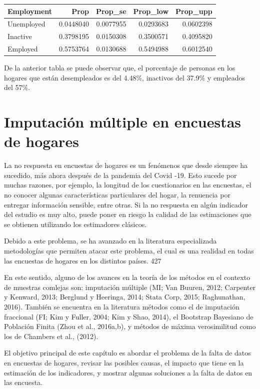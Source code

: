 \documentclass[
  12pt,
]{book}
\begin{document}
\begin{tabular}{l|r|r|r|r}
\hline
Employment & Prop & Prop\_se & Prop\_low & Prop\_upp\\
\hline
Unemployed & 0.0448040 & 0.0077955 & 0.0293683 & 0.0602398\\
\hline
Inactive & 0.3798195 & 0.0150308 & 0.3500571 & 0.4095820\\
\hline
Employed & 0.5753764 & 0.0130688 & 0.5494988 & 0.6012540\\
\hline
\end{tabular}

De la anterior tabla se puede observar que, el porcentaje de personas en los hogares que están desempleados es del 4.48\%, inactivos del 37.9\% y empleados del 57\%.

\hypertarget{imputaciuxf3n-muxfaltiple-en-encuestas-de-hogares}{%
\chapter{Imputación múltiple en encuestas de hogares}\label{imputaciuxf3n-muxfaltiple-en-encuestas-de-hogares}}

La no respuesta en encuestas de hogares es un fenómenos que desde siempre ha sucedido, más ahora después de la pandemia del Covid -19. Esto sucede por muchas razones, por ejemplo, la longitud de los cuestionarios en las encuestas, el no conocer algunas características particulares del hogar, la renuencia por entregar información sensible, entre otras. Si la no respuesta en algún indicador del estudio es muy alto, puede poner en riesgo la calidad de las estimaciones que se obtienen utilizando los estimadores clásicos.

Debido a este problema, se ha avanzado en la literatura especializada metodologías que permiten atacar este problema, el cual es una realidad en todas las encuestas de hogares en los distintos países. 427

En este sentido, alguno de los avances en la teoría de los métodos en el contexto de muestras comlejas son: imputación múltiple (MI; Van Buuren, 2012; Carpenter y Kenward, 2013; Berglund y Heeringa, 2014; Stata Corp, 2015; Raghunathan, 2016). También se encuentra en la literatura métodos como el de imputación fraccional (FI; Kim y Fuller, 2004; Kim y Shao, 2014), el Bootstrap Bayesiano de Población Finita (Zhou et al., 2016a,b), y métodos de máxima verosimilitud como los de Chambers et al., (2012).

El objetivo principal de este capítulo es abordar el problema de la falta de datos en encuestas de hogares, revisar las posibles causas, el impacto que tiene en la estimación de los indicadores, y mostrar algunas soluciones a la falta de datos en las encuesta.
\end{document}
